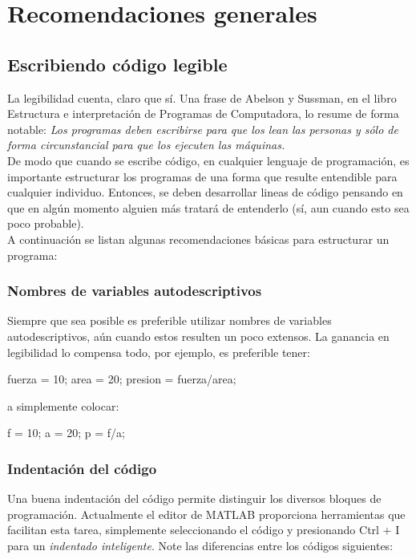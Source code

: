 \chapter{Recomendaciones generales}

\section{Escribiendo código legible}

La legibilidad cuenta, claro que sí. Una frase de Abelson y Sussman, en
el libro Estructura e interpretación de Programas de Computadora, lo
resume de forma notable: \emph{Los programas deben escribirse para que
los lean las personas y sólo de forma circunstancial para que los
ejecuten las máquinas.} \\

De modo que cuando se escribe código, en cualquier lenguaje de
programación, es importante estructurar los programas de una forma que
resulte entendible para cualquier individuo. Entonces, se deben
desarrollar lineas de código pensando en que en algún momento alguien
más tratará de entenderlo (sí, aun cuando esto sea poco probable). \\

A continuación se listan algunas recomendaciones básicas para
estructurar un programa:

\subsection{Nombres de variables autodescriptivos}

Siempre que sea posible es preferible utilizar nombres de variables
autodescriptivos, aún cuando estos resulten un poco extensos. La
ganancia en legibilidad lo compensa todo, por ejemplo, es preferible
tener:

\begin{matlab}
fuerza = 10;
area = 20;
presion = fuerza/area;
\end{matlab}

a simplemente colocar:

\begin{matlab}
f = 10;
a = 20;
p = f/a;
\end{matlab}

\subsection{Indentación del código}

Una buena indentación del código permite distinguir los diversos bloques
de programación. Actualmente el editor de MATLAB proporciona
herramientas que facilitan esta tarea, simplemente seleccionando el
código y presionando Ctrl + I para un \emph{indentado inteligente}. Note
las diferencias entre los códigos siguientes:

